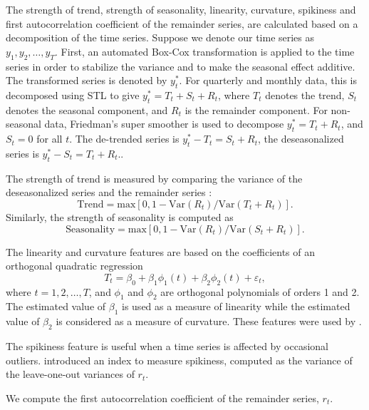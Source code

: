 \documentclass[11pt,a4paper,]{article}
\def\var{\text{Var}}
\theoremstyle{definition}
\theoremstyle{definition}
\theoremstyle{definition}
\theoremstyle{remark}
\begin{document}
The strength of trend, strength of seasonality, linearity, curvature,
spikiness and first autocorrelation coefficient of the remainder series,
are calculated based on a decomposition of the time series. Suppose we
denote our time series as \(y_1, y_2, \dots,y_T\). First, an automated
Box-Cox transformation \autocite{Guerrero1993} is applied to the time
series in order to stabilize the variance and to make the seasonal
effect additive. The transformed series is denoted by \(y_{t}^*\). For
quarterly and monthly data, this is decomposed using STL
\autocite{cleveland1990stl} to give \(y_t^*=T_t+S_t+R_t\), where \(T_t\)
denotes the trend, \(S_t\) denotes the seasonal component, and \(R_t\)
is the remainder component. For non-seasonal data, Friedman's super
smoother \autocite{supsmu} is used to decompose \(y_t^*=T_t+R_t\), and
\(S_t=0\) for all \(t\). The de-trended series is \(y_t^*-T_t=S_t+R_t\),
the deseasonalized series is \(y_t^*-S_t = T_t+R_t\)..

The strength of trend is measured by comparing the variance of the
deseasonalized series and the remainder series \autocite{wang2009rule}:
\[
    \text{Trend} = \text{max}\left[0, 1 - \var(R_{t})/\var(T_t+R_t)\right].
\] Similarly, the strength of seasonality is computed as \[
    \text{Seasonality} = \text{max}\left[0, 1- \var(R_{t})/ \var(S_t+R_t)\right].
\]

The linearity and curvature features are based on the coefficients of an
orthogonal quadratic regression \[
  T_t=\beta_0+\beta_1 \phi_1(t) + \beta_2\phi_2(t) + \varepsilon_t,
\] where \(t=1, 2, \dots,T\), and \(\phi_1\) and \(\phi_2\) are
orthogonal polynomials of orders 1 and 2. The estimated value of
\(\beta_1\) is used as a measure of linearity while the estimated value
of \(\beta_2\) is considered as a measure of curvature. These features
were used by \textcite{hyndman2015large}.


The spikiness feature is useful when a time series is affected by
occasional outliers. \textcite{hyndman2015large} introduced an index to
measure spikiness, computed as the variance of the leave-one-out
variances of \(r_t\).

We compute the first autocorrelation coefficient of the remainder
series, \(r_t\).
\end{document}
